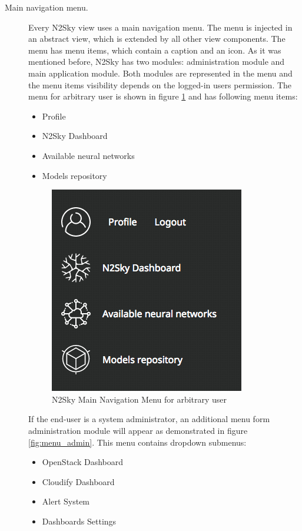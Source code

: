 \begin{description}
\item[Main navigation menu.] Every N2Sky view uses a main navigation menu. The menu is injected in an abstract view, which is extended by all other view components. The menu has menu items, which contain a caption and an icon. As it was mentioned before, N2Sky has two modules: administration module and main application module. Both modules are represented in the menu and the menu items visibility depends on the logged-in users permission. 
The menu for arbitrary user is shown in figure \ref{fig:menu_user}  and has following menu items:

\begin{itemize}
\item Profile 
\item N2Sky Dashboard
\item Available neural networks
\item Models repository
\end{itemize}

 
 \begin{figure}[H]
\begin{center}
  \includegraphics[scale=0.5]{components/3/components/menu_user.png}
  \caption{N2Sky Main Navigation Menu for arbitrary user}
  \label{fig:menu_user}
\end{center}
\end{figure}

If the end-user is a system administrator, an additional menu form administration module will appear as demonstrated in figure \ref{fig:menu_admin}. This menu contains dropdown submenus: 

\begin{itemize}
\item OpenStack Dashboard
\item Cloudify Dashboard
\item Alert System
\item Dashboards Settings
\end{itemize}



\end{description}
